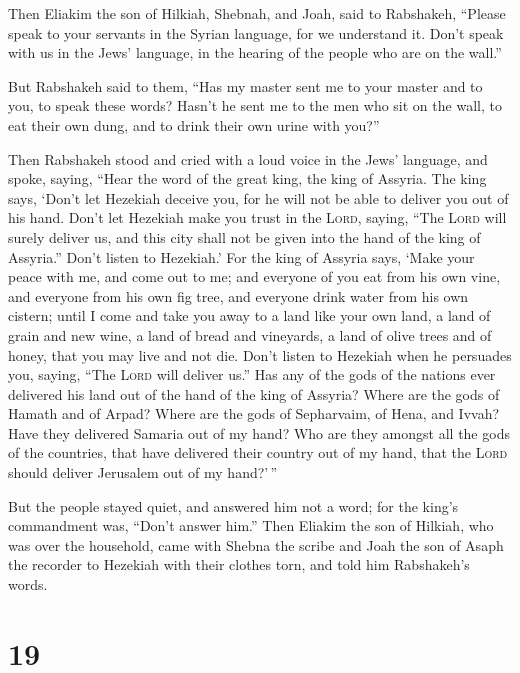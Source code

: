 Then Eliakim the son of Hilkiah, Shebnah, and Joah, said
to Rabshakeh, ``Please speak to your servants in the Syrian language,
for we understand it. Don't speak with us in the Jews' language, in the
hearing of the people who are on the wall.''

 But Rabshakeh said to them, ``Has my master sent me to
your master and to you, to speak these words? Hasn't he sent me to the
men who sit on the wall, to eat their own dung, and to drink their own
urine with you?''

 Then Rabshakeh stood and cried with a loud voice in the
Jews' language, and spoke, saying, ``Hear the word of the great king,
the king of Assyria.  The king says, `Don't let Hezekiah
deceive you, for he will not be able to deliver you out of his hand.
 Don't let Hezekiah make you trust in the \textsc{Lord},
saying, ``The \textsc{Lord} will surely deliver us, and this city shall
not be given into the hand of the king of Assyria.'' 
Don't listen to Hezekiah.' For the king of Assyria says, `Make your
peace with me, and come out to me; and everyone of you eat from his own
vine, and everyone from his own fig tree, and everyone drink water from
his own cistern;  until I come and take you away to a
land like your own land, a land of grain and new wine, a land of bread
and vineyards, a land of olive trees and of honey, that you may live and
not die. Don't listen to Hezekiah when he persuades you, saying, ``The
\textsc{Lord} will deliver us.''  Has any of the gods of
the nations ever delivered his land out of the hand of the king of
Assyria?  Where are the gods of Hamath and of Arpad?
Where are the gods of Sepharvaim, of Hena, and Ivvah? Have they
delivered Samaria out of my hand?  Who are they amongst
all the gods of the countries, that have delivered their country out of
my hand, that the \textsc{Lord} should deliver Jerusalem out of my
hand?'\,''

 But the people stayed quiet, and answered him not a
word; for the king's commandment was, ``Don't answer him.''
 Then Eliakim the son of Hilkiah, who was over the
household, came with Shebna the scribe and Joah the son of Asaph the
recorder to Hezekiah with their clothes torn, and told him Rabshakeh's
words.

\hypertarget{section-18}{%
\section{19}\label{section-18}}

